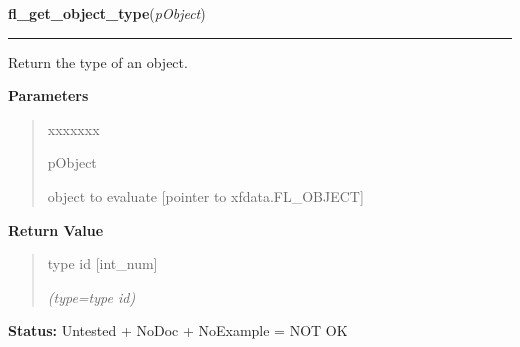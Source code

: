 \hspace{.8\funcindent}\begin{boxedminipage}{\funcwidth}

    \raggedright \textbf{fl\_get\_object\_type}(\textit{pObject})

    \vspace{-1.5ex}

    \rule{\textwidth}{0.5\fboxrule}
\setlength{\parskip}{2ex}
    Return the type of an object.

\setlength{\parskip}{1ex}
      \textbf{Parameters}
      \vspace{-1ex}

      \begin{quote}
        \begin{Ventry}{xxxxxxx}

          \item[pObject]

          object to evaluate [pointer to xfdata.FL\_OBJECT]

        \end{Ventry}

      \end{quote}

      \textbf{Return Value}
    \vspace{-1ex}

      \begin{quote}
      type id [int\_num]

      {\it (type=type id)}

      \end{quote}

\textbf{Status:} Untested + NoDoc + NoExample = NOT OK



    \end{boxedminipage}

    \label{xformslib:library:fl_set_object_boxtype}

    \vspace{0.5ex}

